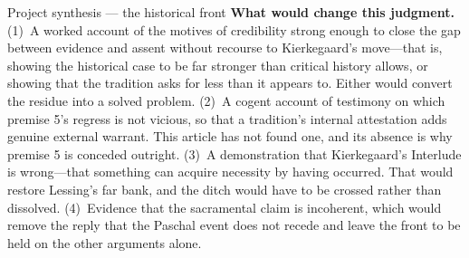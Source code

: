 \begin{studybox}{Project synthesis --- the historical front}
\textbf{What would change this judgment.} (1)~A worked account of the motives of credibility strong enough to close the gap between evidence and assent without recourse to Kierkegaard's move---that is, showing the historical case to be far stronger than critical history allows, or showing that the tradition asks for less than it appears to. Either would convert the residue into a solved problem. (2)~A cogent account of testimony on which premise 5's regress is not vicious, so that a tradition's internal attestation adds genuine external warrant. This article has not found one, and its absence is why premise 5 is conceded outright. (3)~A demonstration that Kierkegaard's Interlude is wrong---that something can acquire necessity by having occurred. That would restore Lessing's far bank, and the ditch would have to be crossed rather than dissolved. (4)~Evidence that the sacramental claim is incoherent, which would remove the reply that the Paschal event does not recede and leave the front to be held on the other arguments alone.
\end{studybox}
